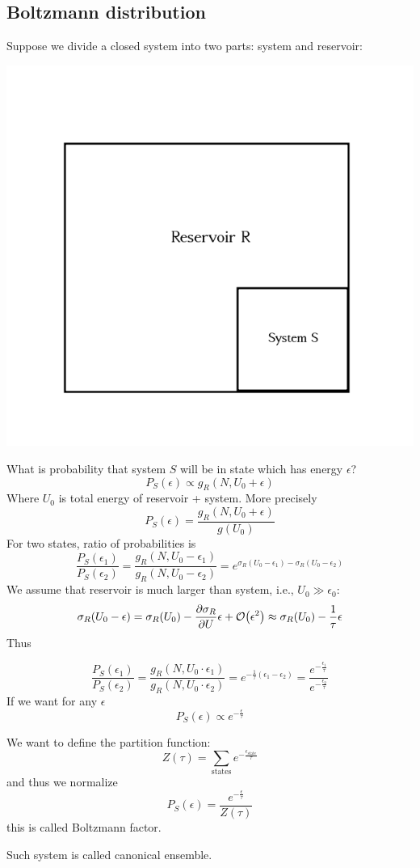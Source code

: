 \subsection{Boltzmann distribution}
Suppose we divide a closed system into two parts: system and reservoir: 
\begin{center}
	\includegraphics[width=0.5\linewidth]{./lect5/pic1.png}
\end{center}
What is probability that system $S$ will be in state which has energy $\epsilon$?
$$P_S(\epsilon)  \propto g_R(N,U_0 + \epsilon)$$
Where $U_0$ is total energy of reservoir + system. 
More precisely
$$P_S(\epsilon) = \frac{g_R(N,U_0 + \epsilon)}{g(U_0)}$$
For two states, ratio of probabilities is
$$\frac{P_S(\epsilon_1)}{P_S(\epsilon_2)} = \frac{g_R(N,U_0 - \epsilon_1)}{g_R(N,U_0 - \epsilon_2)} = e^{\sigma_R(U_0-\epsilon_1)-\sigma_R(U_0-\epsilon_2)}$$ 
We assume that reservoir is much larger than system, i.e., $U_0 \gg \epsilon_0$:
$$\sigma_R(U_0 -\epsilon) = \sigma_R(U_0) - \pdv{\sigma_R}{U}\epsilon + \order{\epsilon^2} \approx  \sigma_R(U_0) - \frac{1}{\tau} \epsilon$$
Thus

$$\frac{P_S(\epsilon_1)}{P_S(\epsilon_2)} = \frac{g_R(N,U_0 \cdot \epsilon_1)}{g_R(N,U_0 \cdot \epsilon_2)} = e^{-\frac{1}{\tau} (\epsilon_1-\epsilon_2)} = \frac{ e^{-\frac{\epsilon_1}{\tau}}}{ e^{-\frac{\epsilon_2}{\tau}}}$$ 
If we want for any $\epsilon$
$$P_S(\epsilon) \propto e^{-\frac{\epsilon}{\tau}}$$

We want to define the partition function:
$$Z(\tau) = \sum_{\text{states}} e^{-\frac{\epsilon_{\text{state}}}{\tau}}$$
and thus we normalize
$$P_S(\epsilon) = \frac{e^{-\frac{\epsilon}{\tau}}}{Z(\tau)}$$
this is called Boltzmann factor.

Such system is called canonical ensemble.